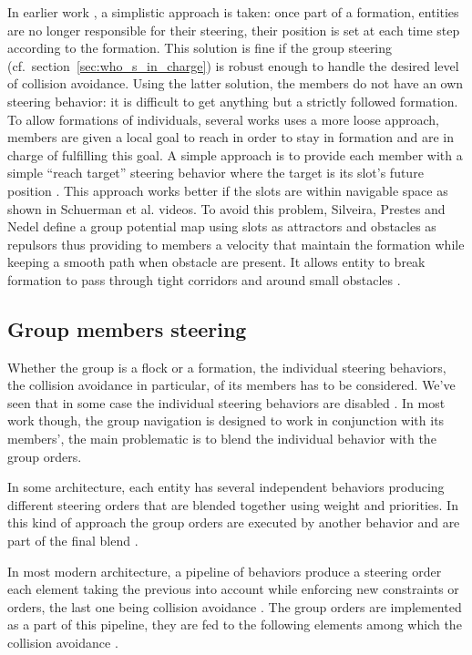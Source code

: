 \documentclass[a4paper,titlepage]{article}
\begin{document}
In earlier work \cite{Pottinger:1999vk}, a simplistic approach is taken: once part of a formation, entities are no longer responsible for their steering, their position is set at each time step according to the formation. This solution is fine if the group steering (cf.\ section~\ref{sec:who_s_in_charge}) is robust enough to handle the desired level of collision avoidance.
Using the latter solution, the members do not have an own steering behavior: it is difficult to get anything but a strictly followed formation. To allow formations of individuals, several works uses a more loose approach, members are given a local goal to reach in order to stay in formation and are in charge of fulfilling this goal. A simple approach is to provide each member with a simple “reach target” steering behavior where the target is its slot’s future position \cite{Karamouzas:2010fi,Schuerman:2010um}. This approach works better if the slots are within navigable space as shown in Schuerman et al. videos. To avoid this problem, Silveira, Prestes and Nedel define a group potential map using slots as attractors and obstacles as repulsors thus providing to members a velocity that maintain the formation while keeping a smooth path when obstacle are present. It allows entity to break formation to pass through tight corridors and around small obstacles \cite{Silveira:2008bc}.

\subsection{Group members steering}
\label{sec:stay_grouped:group_members_steering}

Whether the group is a flock or a formation, the individual steering behaviors, the collision avoidance in particular, of its members has to be considered. We’ve seen that in some case the individual steering behaviors are disabled \cite{Pottinger:1999vk}. In most work though, the group navigation is designed to work in conjunction with its members’, the main problematic is to blend the individual behavior with the group orders.

In some architecture, each entity has several independent behaviors producing different steering orders that are blended together using weight and priorities. In this kind of approach the group orders are executed by another behavior and are part of the final blend \cite{Moussaid:2010ib,Qiu:2010ww,Hostetler:2002wg}. 

In most modern architecture, a pipeline of behaviors produce a steering order each element taking the previous into account while enforcing new constraints or orders, the last one being collision avoidance \cite{GolaemPath:tw,Mononen:2010wp}. The group orders are implemented as a part of this pipeline, they are fed to the following elements among which the collision avoidance \cite{Karamouzas:2010fi,Silveira:2008bc}. 
\end{document}
